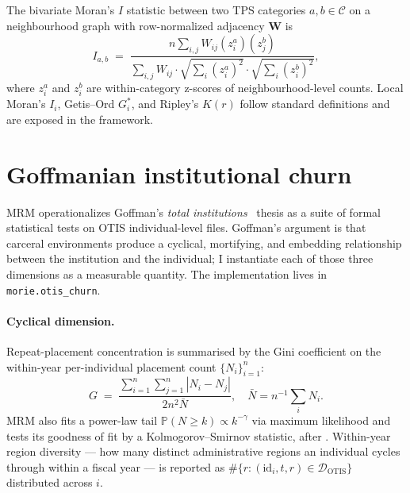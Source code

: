 \documentclass[11pt,a4paper]{article}
\theoremstyle{plain}
\theoremstyle{definition}
\theoremstyle{remark}
\newcommand{\PP}{\mathbb{P}}
\begin{document}
The bivariate Moran's $I$ statistic between two TPS categories
$a, b \in \mathcal{C}$ on a neighbourhood graph with row-normalized
adjacency $\mathbf{W}$ is
\begin{equation}
  I_{a,b}
  \;=\;
  \frac{n \sum_{i,j} W_{ij}
        (z^{a}_{i})(z^{b}_{j})}
       {\sum_{i,j} W_{ij}
        \cdot \sqrt{\sum_i (z^a_i)^2}
        \cdot \sqrt{\sum_i (z^b_i)^2}},
  \label{eq:bivariate-morans}
\end{equation}
where $z^{a}_{i}$ and $z^{b}_{i}$ are within-category z-scores of
neighbourhood-level counts. Local Moran's $I_{i}$, Getis--Ord
$G^{\ast}_{i}$, and Ripley's $K(r)$ follow standard definitions
and are exposed in the framework.

\section{Goffmanian institutional churn}
\label{sec:churn}

MRM operationalizes Goffman's
\emph{total institutions}~\cite{Goffman1961Asylums} thesis as a
suite of formal statistical tests on OTIS individual-level files.
Goffman's argument is that carceral environments produce a
cyclical, mortifying, and embedding relationship between the
institution and the individual; I instantiate each of those
three dimensions as a measurable quantity. The implementation
lives in \texttt{morie.otis\_churn}.

\paragraph{Cyclical dimension.}
Repeat-placement concentration is summarised by the Gini
coefficient on the within-year per-individual placement count
$\{N_{i}\}_{i=1}^{n}$:
\begin{equation}
  G \;=\; \frac{\sum_{i=1}^{n}\sum_{j=1}^{n}
                |N_{i} - N_{j}|}
              {2 n^{2} \bar{N}},
  \quad
  \bar{N} = n^{-1}\sum_{i} N_{i}.
  \label{eq:churn-gini}
\end{equation}
MRM also fits a power-law tail
$\PP(N \ge k) \propto k^{-\gamma}$ via maximum likelihood and tests
its goodness of fit by a Kolmogorov--Smirnov statistic, after
\cite{ClausetShalizi2009Powerlaw}. Within-year region diversity ---
how many distinct administrative regions an individual cycles
through within a fiscal year --- is reported as
$\#\{r : (\text{id}_{i}, t, r) \in \mathcal{D}_{\mathrm{OTIS}}\}$
distributed across $i$.
\end{document}
